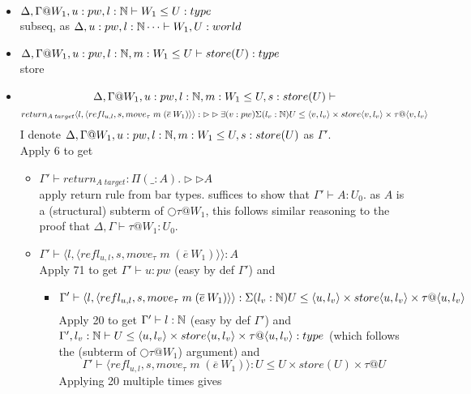 \documentclass{article}
\begin{document}
\begin{itemize}
     \item $\Delta, \Gamma@W_1, u: pw, l: \N \vdash W_1 \leq U: type$\\
     subseq, as $\Delta,  u: pw, l : \mathbb{N} \dots \vdash W_1, U : world$
     \item $\Delta, \Gamma@W_1, u: pw, l : \N, m: W_1 \leq U \vdash  store(U) : type$\\
     store
     \item \[\Delta, \Gamma@W_1, u: pw, l : \N, m: W_1 \leq U, s: store(U) \vdash\]
     \[return_{A\;target}\langle l, \langle refl_{u, l}, s, move_{\tau}\;m\;(\overline{e} \: W_1) \rangle\rangle: \rhd \rhd \exists(v: pw)\Sigma(l_v : \N)U \leq \langle v, l_v\rangle \times store\langle v, l_v\rangle \times \tau@\langle v, l_v\rangle \]
     I denote $\Delta, \Gamma@W_1, u: pw, l : \N, m: W_1 \leq U, s: store(U) $ as $\Gamma'$.\\
     Apply 6 to get
     \begin{itemize}
         \item $\Gamma' \vdash return_{A\;target} : \Pi(\_ :A).\rhd \rhd A$\\
        apply return rule from bar types. suffices to show that
        $\Gamma' \vdash A: U_0$. as $A$ is a (structural) subterm of $\bigcirc \tau @ W_1$, this follows similar reasoning to the proof that $\Delta, \Gamma \vdash \tau @ W_1 : U_0$.
         \item $\Gamma' \vdash \langle l, \langle refl_{u, l}, s, move_{\tau}\;m\;(\overline{e} \: W_1) \rangle\rangle : A$\\
         Apply 71 to get $\Gamma' \vdash u : pw$ (easy by def $\Gamma'$) and 
         \begin{itemize}
             \item \[\Gamma' \vdash  \langle l, \langle refl_{u, l}, s, move_{\tau}\;m\;(\overline{e} \: W_1) \rangle\rangle: \Sigma(l_v : \N)U \leq \langle u, l_v\rangle \times store\langle u, l_v\rangle \times \tau@\langle u, l_v\rangle\]
             Apply 20 to get $\Gamma' \vdash l : \mathbb{N}$ (easy by def $\Gamma'$) and\\  $\Gamma', l_v: \N \vdash U \leq \langle u, l_v\rangle \times store\langle u, l_v\rangle \times \tau@\langle u, l_v\rangle : type$ (which follows the (subterm of $\bigcirc \tau @ W_1$) argument) and 
      \[\Gamma' \vdash \langle refl_{u, l}, s, move_{\tau}\;m\;(\overline{e} \: W_1) \rangle :
                 U \leq U \times store(U) \times \tau@U\]
                 Applying 20 multiple times gives

\end{itemize}
\end{itemize}
\end{itemize}
\end{document}
